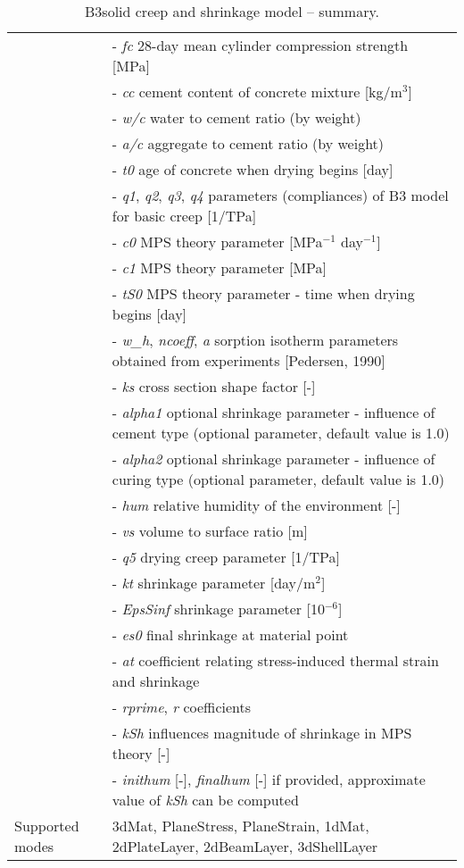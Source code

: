 \documentclass[a4paper]{article}
\newcommand{\param}[1]{{\it #1}}
\newenvironment{mmt}{\begin{tabular}{|l|p{9cm}|}}{\end{tabular}\\}
\newenvironment{mmt}{\begin{tabular}{|l|l|}}{\end{tabular}\\}
\begin{document}
\begin{table}
\begin{mmt}
\hline
&- \param{fc} 28-day mean cylinder compression strength [MPa]\\
&- \param{cc} cement content of concrete mixture  [kg/m$^{3}$] \\
&- \param{w/c} water to cement ratio (by weight)\\
&- \param{a/c} aggregate to cement ratio (by weight)\\
&- \param{t0} age of concrete when drying begins [day]\\
&- \param{q1}, \param{q2}, \param{q3}, \param{q4} parameters
(compliances) of B3 model for basic creep [1/TPa]\\

&- \param{c0} MPS theory parameter [MPa$^{-1}$ day$^{-1}$] \\
&- \param{c1} MPS theory parameter [MPa]\\
&- \param{tS0} MPS theory parameter - time when drying begins [day]\\
&- \param{w\_h}, \param{ncoeff}, \param{a} sorption isotherm parameters obtained from experiments [Pedersen, 1990] \\

&- \param{ks} cross section shape factor [-]\\
&- \param{alpha1} optional shrinkage parameter - influence of cement type (optional parameter, default value is 1.0)\\
&- \param{alpha2} optional shrinkage parameter - influence of curing type (optional parameter, default value is 1.0)\\
&- \param{hum} relative humidity of the environment [-]\\
&- \param{vs} volume to surface ratio [m]\\
&- \param{q5} drying creep parameter [1/TPa]\\
&- \param{kt} shrinkage parameter [day/m$^2$]\\
&- \param{EpsSinf} shrinkage parameter [10$^{-6}$]\\

&- \param{es0} final shrinkage at material point\\
&- \param{at} coefficient relating stress-induced thermal strain and shrinkage\\
&- \param{rprime}, \param{r} coefficients\\

&- \param{kSh} influences magnitude of shrinkage in MPS theory [-]\\
&- \param{inithum} [-], \param{finalhum} [-] if provided, approximate value of \param{kSh} can be computed\\


Supported modes& 3dMat, PlaneStress, PlaneStrain, 1dMat,
2dPlateLayer, 2dBeamLayer, 3dShellLayer\\
\hline
\end{mmt}

\caption{B3solid creep and shrinkage model -- summary.}
\label{b3solid_table}

\end{table}
\end{document}
